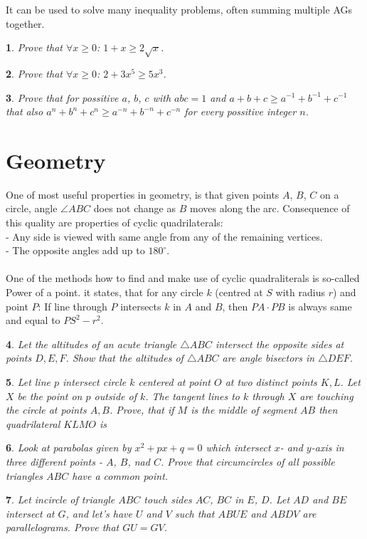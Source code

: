 \documentclass[12pt]{article}
\newtheorem{problem}{}
\begin{document}
It can be used to solve many inequality problems, often summing multiple AGs together.

\begin{problem}
Prove that $\forall x\ge 0$: $1 + x \ge 2\sqrt{x}$.
\end{problem}
\begin{problem}
Prove that $\forall x\ge 0$: $2 + 3x^5 \ge 5x^3$.
\end{problem}
\begin{problem}
Prove that for possitive $a$, $b$, $c$ with $abc = 1$ and $a+b+c \ge a^{-1} + b^{-1} + c^{-1}$ that also $a^n+b^n+c^n \ge a^{-n} + b^{-n} + c^{-n}$ for every possitive integer $n$.
\end{problem}

\section{Geometry}

One of most useful properties in geometry, is that given points $A$, $B$, $C$ on a circle, angle $\angle ABC$ does not change as $B$ moves along the arc. Consequence of this quality are properties of cyclic quadrilaterals:\\
- Any side is viewed with same angle from any of the remaining vertices.\\
- The opposite angles add up to $180^\circ$.\\
\\One of the methods how to find and make use of cyclic quadraliterals is so-called Power of a point. it states, that for any circle $k$ (centred at $S$ with radius $r$) and point $P$: If line through $P$ intersects $k$ in $A$ and $B$, then $PA \cdot PB$ is always same and equal to $PS^2 - r^2$.

\begin{problem}
Let the altitudes of an acute triangle $\triangle ABC$ intersect the opposite sides at points $D, E, F$.	Show that the altitudes of $\triangle ABC$ are angle bisectors in $\triangle DEF$.
\end{problem}

\begin{problem}
Let line $p$ intersect circle $k$ centered at point $O$ at two distinct points $K, L$. Let $X$ be the point on $p$ outside of $k$. The tangent lines to $k$ through $X$ are touching the circle at points $A, B$. Prove, that if $M$ is the middle of segment $AB$ then quadrilateral $KLMO$ is  
\end{problem}

\begin{problem}
Look at parabolas given by $x^2 +px + q = 0$ which intersect $x$- and $y$-axis in three different points - $A$, $B$, nad $C$. Prove that circumcircles of all possible triangles $ABC$ have a common point.
\end{problem}

\begin{problem}
Let incircle of triangle $ABC$ touch sides $AC$, $BC$ in $E$, $D$. Let $AD$ and $BE$ intersect at $G$, and let's have $U$ and $V$ such that $ABUE$
and $ABDV$ are parallelograms. Prove that $GU = GV$.
\end{problem}
\end{document}
